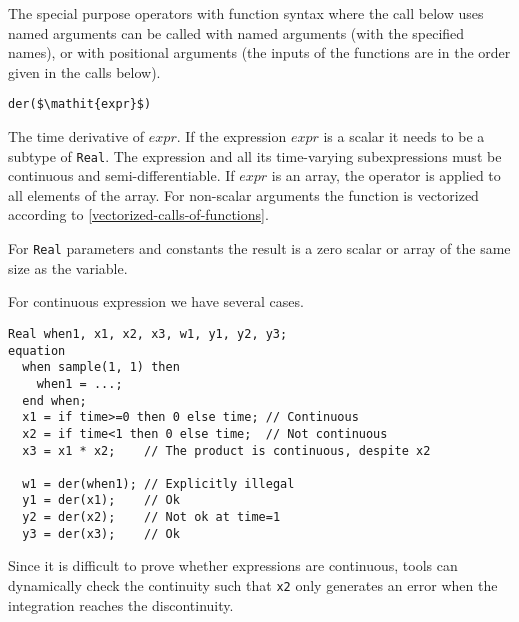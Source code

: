 The special purpose operators with function syntax where the call below uses named arguments can be called with named arguments (with the specified names), or with positional arguments (the inputs of the functions are in the order given in the calls below).

\begin{operatordefinition}[der]
\begin{synopsis}\begin{lstlisting}
der($\mathit{expr}$)
\end{lstlisting}\end{synopsis}
\begin{semantics}
The time derivative of $\mathit{expr}$.
If the expression $\mathit{expr}$ is a scalar it needs to be a subtype of \lstinline!Real!.
The expression and all its time-varying subexpressions must be continuous and semi-differentiable.
If $\mathit{expr}$ is an array, the operator is applied to all elements of the array.
For non-scalar arguments the function is vectorized according to \cref{vectorized-calls-of-functions}.
\begin{nonnormative}
For \lstinline!Real! parameters and constants the result is a zero scalar or array of the same size as the variable.
\end{nonnormative}

\begin{example}
For continuous expression we have several cases.
\begin{lstlisting}[language=modelica]
  Real when1, x1, x2, x3, w1, y1, y2, y3;
equation
  when sample(1, 1) then
    when1 = ...;
  end when;
  x1 = if time>=0 then 0 else time; // Continuous
  x2 = if time<1 then 0 else time;  // Not continuous
  x3 = x1 * x2;    // The product is continuous, despite x2
  
  w1 = der(when1); // Explicitly illegal
  y1 = der(x1);    // Ok
  y2 = der(x2);    // Not ok at time=1
  y3 = der(x3);    // Ok
\end{lstlisting}
Since it is difficult to prove whether expressions are continuous, tools can dynamically check the continuity such that \lstinline!x2! only generates an error when the integration reaches the discontinuity.
\end{example}

\end{semantics}
\end{operatordefinition}

